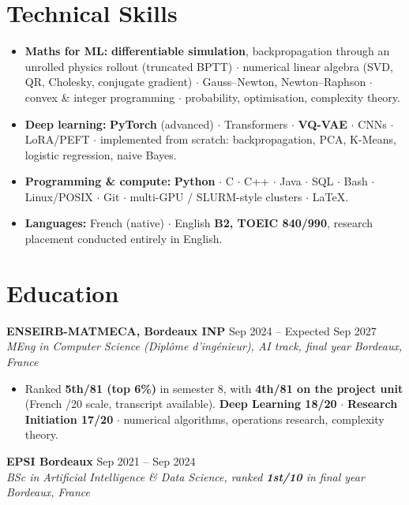 \documentclass[10pt, letterpaper]{article}
\newcommand{\entry}[4]{%
  \noindent \textbf{#1} \hfill #2 \\
  \textit{#3} \hfill \textit{#4} \par
}
\begin{document}
\section{Technical Skills}
\begin{itemize}
    \item \textbf{Maths for ML:} \textbf{differentiable simulation}, backpropagation through an unrolled physics rollout (truncated BPTT) $\cdot$ numerical linear algebra (SVD, QR, Cholesky, conjugate gradient) $\cdot$ Gauss--Newton, Newton--Raphson $\cdot$ convex \& integer programming $\cdot$ probability, optimisation, complexity theory.
    \item \textbf{Deep learning:} \textbf{PyTorch} (advanced) $\cdot$ Transformers $\cdot$ \textbf{VQ-VAE} $\cdot$ CNNs $\cdot$ LoRA/PEFT $\cdot$ implemented from scratch: backpropagation, PCA, K-Means, logistic regression, naive Bayes.
    \item \textbf{Programming \& compute:} \textbf{Python} $\cdot$ C $\cdot$ C++ $\cdot$ Java $\cdot$ SQL $\cdot$ Bash $\cdot$ Linux/POSIX $\cdot$ Git $\cdot$ multi-GPU / SLURM-style clusters $\cdot$ \LaTeX{}.
    \item \textbf{Languages:} French (native) $\cdot$ English \textbf{B2, TOEIC 840/990}, research placement conducted entirely in English.
\end{itemize}

\section{Education}

\entry{ENSEIRB-MATMECA, Bordeaux INP}{Sep 2024 -- Expected Sep 2027}%
{MEng in Computer Science (\textit{Diplôme d'ingénieur}), AI track, final year}{Bordeaux, France}
\begin{itemize}
    \item Ranked \textbf{5th/81 (top 6\%)} in semester 8, with \textbf{4th/81 on the project unit} (French /20 scale, transcript available). \textbf{Deep Learning 18/20} $\cdot$ \textbf{Research Initiation 17/20} $\cdot$ numerical algorithms, operations research, complexity theory.
\end{itemize}

\vspace{3pt}

\entry{EPSI Bordeaux}{Sep 2021 -- Sep 2024}%
{BSc in Artificial Intelligence \& Data Science, ranked \textbf{1st/10} in final year}{Bordeaux, France}
\end{document}

